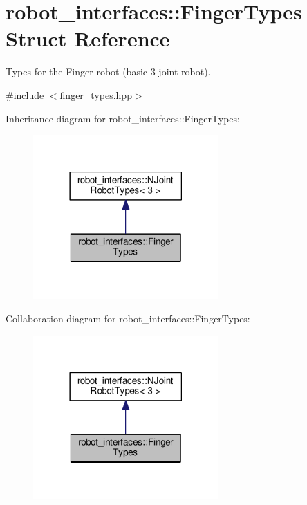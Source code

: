 \hypertarget{structrobot__interfaces_1_1FingerTypes}{}\section{robot\+\_\+interfaces\+:\+:Finger\+Types Struct Reference}
\label{structrobot__interfaces_1_1FingerTypes}


Types for the Finger robot (basic 3-\/joint robot).  




{\ttfamily \#include $<$finger\+\_\+types.\+hpp$>$}



Inheritance diagram for robot\+\_\+interfaces\+:\+:Finger\+Types\+:
\nopagebreak
\begin{figure}[H]
\begin{center}
\leavevmode
\includegraphics[width=201pt]{structrobot__interfaces_1_1FingerTypes__inherit__graph}
\end{center}
\end{figure}


Collaboration diagram for robot\+\_\+interfaces\+:\+:Finger\+Types\+:
\nopagebreak
\begin{figure}[H]
\begin{center}
\leavevmode
\includegraphics[width=201pt]{structrobot__interfaces_1_1FingerTypes__coll__graph}
\end{center}
\end{figure}
